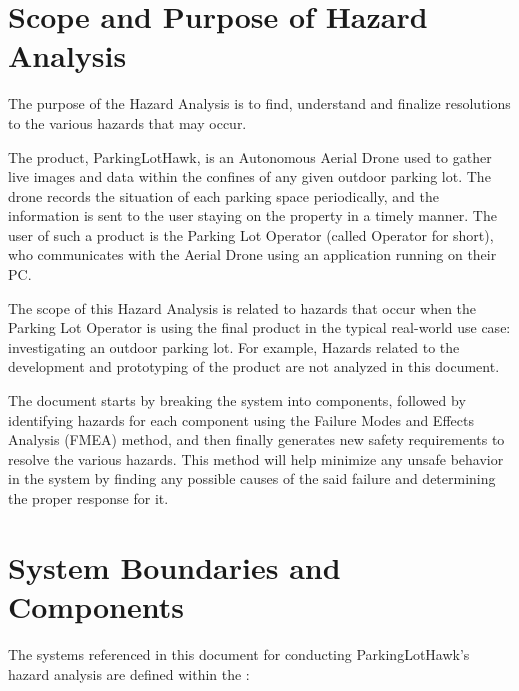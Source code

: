 \documentclass{article}
\begin{document}
\section{Scope and Purpose of Hazard Analysis}

The purpose of the Hazard Analysis is to find, understand and finalize resolutions to the various hazards that may occur.  

The product, ParkingLotHawk, is an Autonomous Aerial Drone used to gather live images and data within the confines of any given outdoor parking lot. The drone records the situation of each parking space periodically, and the information is sent to the user staying on the property in a timely manner. The user of such a product is the Parking Lot Operator (called Operator for short), who communicates with the Aerial Drone using an application running on their PC.

The scope of this Hazard Analysis is related to hazards that occur when the Parking Lot Operator is using the final product in the typical real-world use case: investigating an outdoor parking lot. For example, Hazards related to the development and prototyping of the product are not analyzed in this document. 

The document starts by breaking the system into components, followed by identifying hazards for each component using the Failure Modes and Effects Analysis (FMEA) method, and then finally generates new safety requirements to resolve the various hazards. This method will help minimize any unsafe behavior in the system by finding any possible causes of the said failure and determining the proper response for it.

\section{System Boundaries and Components}
\label{SystemBoundaries}
The systems referenced in this document for conducting ParkingLotHawk’s hazard analysis are defined within the :
\end{document}
